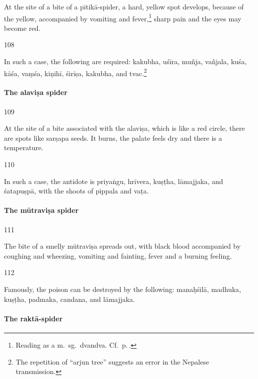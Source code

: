 \begin{translation}
At the site of a bite of a \Gls{pītikā-spider}, a hard, yellow spot develops, 
because of the yellow, accompanied by vomiting and fever,\footnote{Reading 
 as a m.\ sg.\ dvandva. Cf.\ p.\,\pageref{masc-dvandva}.} 
sharp pain and the eyes may 
become red.

\item[108]

In such a case, the following are required:
\gls{kakubha},
\gls{uśīra},
\gls{muñja},
\gls{vañjala},
%
\gls{kuśa},
\gls{kāśa},
\gls{vaṃśa},
\gls{kiṇihī},
\gls{śirīṣa},
\gls{kakubha},
and 
\gls{tvac}.\footnote{The repetition of  “arjun tree” suggests an 
error in the Nepalese transmission.}

\paragraph{The \Gls{alaviṣa} spider}

\item[109]

At the site of a bite associated with the \Gls{alaviṣa}, which is like a red circle, 
there are spots like \gls{sarṣapa} seeds.  It burns, the palate feels dry and 
there is a temperature.

\item [110]

In such a case, the antidote is
\gls{priyaṅgu},
\gls{hrīvera},
\gls{kuṣṭha},
\gls{lāmajjaka}, and
\gls{śatapuṣpā},
with the shoots of 
\gls{pippala}
and \gls{vaṭa}.


\paragraph{The \Gls{mūtraviṣa} spider}

\item[111]

The bite of a smelly \Gls{mūtraviṣa} spreads out, with black blood
accompanied by coughing and wheezing, vomiting and fainting, fever and
a burning feeling.

\item [112]

Famously, the poison can be destroyed by the following:
\gls{manaḥśilā},
\gls{madhuka},
\gls{kuṣṭha},
\gls{padmaka},
\gls{candana}, and
\gls{lāmajjaka}.


\paragraph{The \Gls{raktā-spider}}


\end{translation}
